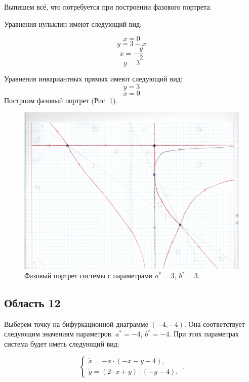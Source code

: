 Выпишем всё, что потребуется при построении фазового портрета:

Уравнения нульклин имеют следующий вид: 

$$x=0$$
$$y=3 - x$$
$$x=- \frac{y}{2}$$
$$y=3$$


Уравнения инвариантных прямых имеют следующий вид: 
$$y = 3$$
$$x = 0$$
Построим фазовый портрет (Рис. \ref{fig:phportr11}).

\begin{figure}[h]
	
	\includegraphics[width=\textwidth]{phptr/(3,-9).jpg}
	\centering
	\caption{\label{fig:phportr11} Фазовый портрет системы с параметрами $a^\ast = 3$, $b^\ast = 3$.}
	
\end{figure}

\subsection{Область 12}

Выберем точку на бифуркационной диаграмме $(-4, -4)$. Она соответствует следующим значениям параметров:  $a^\ast = -4$, $b^\ast = -4$. При этих параметрах система будет иметь следующий вид: 

$$
\left \lbrace 
\begin{matrix} 
	\dot{x} = -x \cdot (-x - y - 4), \\
	\dot{y} = (2 \cdot x + y) \cdot (-y - 4). \
\end{matrix} 
\right . .$$

